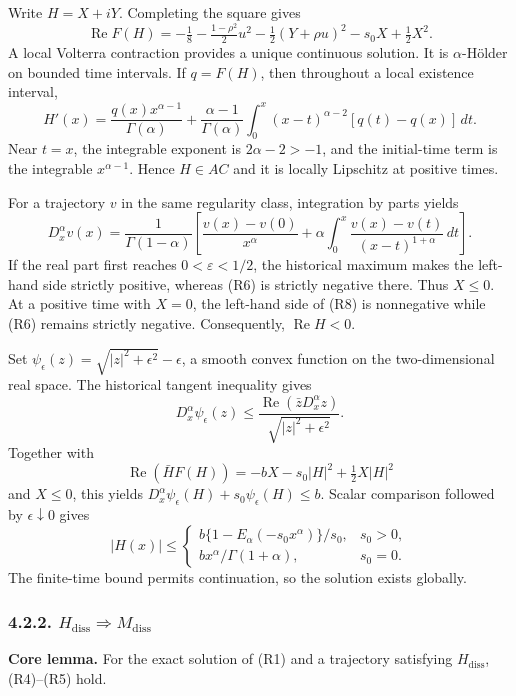 \documentclass[a4paper,11pt]{article}
\begin{document}
Write \(H=X+iY\). Completing the square gives
\[
\operatorname{Re}F(H)
=-\tfrac18-\tfrac{1-\rho^2}{2}u^2
-\tfrac12(Y+\rho u)^2-s_0X+\tfrac12X^2.
\tag{R6}
\]
A local Volterra contraction provides a unique continuous solution. It is \(\alpha\)-Hölder on bounded time intervals. If \(q=F(H)\), then throughout a local existence interval,
\[
H'(x)=\frac{q(x)x^{\alpha-1}}{\Gamma(\alpha)}
+\frac{\alpha-1}{\Gamma(\alpha)}
\int_0^x(x-t)^{\alpha-2}[q(t)-q(x)]\,dt.
\tag{R7}
\]
Near \(t=x\), the integrable exponent is \(2\alpha-2>-1\), and the initial-time term is the integrable \(x^{\alpha-1}\). Hence \(H\in AC\) and it is locally Lipschitz at positive times.

For a trajectory \(v\) in the same regularity class, integration by parts yields
\[
D_x^\alpha v(x)=\frac1{\Gamma(1-\alpha)}
\left[\frac{v(x)-v(0)}{x^\alpha}
+\alpha\int_0^x\frac{v(x)-v(t)}{(x-t)^{1+\alpha}}\,dt\right].
\tag{R8}
\]
If the real part first reaches \(0<\varepsilon<1/2\), the historical maximum makes the left-hand side strictly positive, whereas (R6) is strictly negative there. Thus \(X\le0\). At a positive time with \(X=0\), the left-hand side of (R8) is nonnegative while (R6) remains strictly negative. Consequently, \(\operatorname{Re}H<0\).

Set \(\psi_\epsilon(z)=\sqrt{|z|^2+\epsilon^2}-\epsilon\), a smooth convex function on the two-dimensional real space. The historical tangent inequality gives
\[
D_x^\alpha\psi_\epsilon(z)
\le\frac{\operatorname{Re}(\bar z D_x^\alpha z)}{\sqrt{|z|^2+\epsilon^2}}.
\tag{R9}
\]
Together with
\[
\operatorname{Re}(\bar H F(H))=-bX-s_0|H|^2+\tfrac12X|H|^2
\]
and \(X\le0\), this yields \(D_x^\alpha\psi_\epsilon(H)+s_0\psi_\epsilon(H)\le b\). Scalar comparison followed by \(\epsilon\downarrow0\) gives
\[
|H(x)|\le
\begin{cases}
b\{1-E_\alpha(-s_0x^\alpha)\}/s_0,&s_0>0,\\
bx^\alpha/\Gamma(1+\alpha),&s_0=0.
\end{cases}
\tag{R10}
\]
The finite-time bound permits continuation, so the solution exists globally.

\subsubsection*{4.2.2. \(H_{\mathrm{diss}}\Rightarrow M_{\mathrm{diss}}\)}

\textbf{Core lemma.} For the exact solution of (R1) and a trajectory satisfying \(H_{\mathrm{diss}}\), (R4)–(R5) hold.
\end{document}
